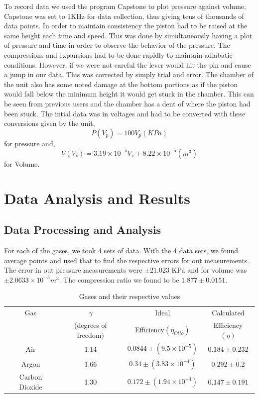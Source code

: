\documentclass[11pt,letterpaper,onecolumn]{article}
\begin{document}
 To record data we used the program Capstone to plot pressure against volume. Capstone was set to 1KHz for data collection, thus giving tens of thousands of data points. In order to maintain consistency the piston had to be raised at the same height each time and speed. This was done by simultaneously having a plot of pressure and time in order to observe the behavior of the pressure. The compressions and expansions had to be done rapidly to maintain adiabatic conditions. However, if we were not careful the lever would hit the pin and cause a jump in our data. This was corrected by simply trial and error. The chamber of the unit also has some noted damage at the bottom portions as if the piston would fall below the minimum height it would get stuck in the chamber. This can be seen from previous users and the chamber has a dent of where the piston had been stuck. The intial data was in voltages and had to be converted with these conversions given by the unit,
 $$P(V_p)=100V_p (KPa)$$
 for pressure and,
 $$V(V_v)=3.19\times10^{-5}V_v+8.22\times10^{-5} (m^3)$$
 for Volume.
 
 
 


\section{Data Analysis and Results}

\subsection{Data Processing and Analysis}

For each of the gases, we took 4 sets of data. With the 4 data sets, we found average points and used that to find the respective errors for out measurements.   
The error in out pressure measurements were $\pm21.023$ KPa and for volume was $\pm2.0633\times10^{-5} m^3$. The compression ratio we found to be $1.877\pm0.0151$.

\begin{table}[H]
\centering
\begin{tabular}{|c|c|c|c|}
 \hline
 Gas & $\gamma$  & Ideal & Calculated \\
 & (degrees of freedom) & Efficiency$(\eta_{Otto})$ & Efficiency $(\eta)$ \\ \hline
 Air & 1.14 & $0.0844\pm(9.5\times10^{-5})$ & $0.184\pm0.232$ \\
 Argon & 1.66 & $0.34\pm(3.83\times10^{-4})$ & $0.292\pm0.2$ \\
 Carbon Dioxide & 1.30 & $0.172\pm(1.94\times10^{-4})$ & $0.147\pm0.191$ \\
 \hline

\end{tabular}
\caption{Gases and their respective values}
\label{tab:data}
\end{table}
\end{document}
